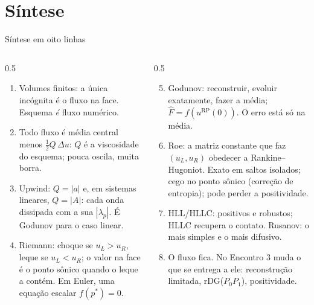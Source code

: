 \documentclass[aspectratio=169,10pt]{beamer}
\newcommand{\Fh}{\widehat F}
\newcommand{\RP}{u^{\mathrm{RP}}}
\begin{document}
\section{Síntese}

\begin{frame}{Síntese em oito linhas}
\begin{columns}[T]
\begin{column}{0.5\textwidth}
\begin{enumerate}
\item Volumes finitos: a única incógnita é o fluxo na face. Esquema \emph{é} fluxo numérico.
\item Todo fluxo é média central menos $\tfrac12Q\,\Delta u$: $Q$ é a viscosidade do esquema; pouca oscila, muita borra.
\item Upwind: $Q=|a|$ e, em sistemas lineares, $Q=|A|$: cada onda dissipada com a sua $|\lambda_p|$. É Godunov para o caso linear.
\item Riemann: choque se $u_L>u_R$, leque se $u_L<u_R$; o valor na face é o ponto sônico quando o leque a contém. Em Euler, uma equação escalar $f(p^*)=0$.
\end{enumerate}
\end{column}
\begin{column}{0.5\textwidth}
\begin{enumerate}\setcounter{enumi}{4}
\item Godunov: reconstruir, evoluir exatamente, fazer a média; $\Fh=f(\RP(0))$. O erro está só na média.
\item Roe: a matriz constante que faz $(u_L,u_R)$ obedecer a Rankine--Hugoniot. Exato em saltos isolados; cego no ponto sônico (correção de entropia); pode perder a positividade.
\item HLL/HLLC: positivos e robustos; HLLC recupera o contato. Rusanov: o mais simples e o mais difusivo.
\item O fluxo fica. No Encontro 3 muda o que se entrega a ele: reconstrução limitada, rDG($P_0P_1$), positividade.
\end{enumerate}
\end{column}
\end{columns}
\end{frame}
\end{document}

